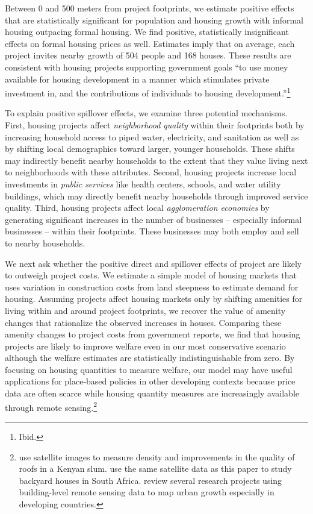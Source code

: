 \documentclass[12pt]{article}
\begin{document}
Between 0 and 500 meters from project footprints, we estimate positive effects that are statistically significant for population and housing growth with informal housing outpacing formal housing.   We find positive, statistically insignificant effects on formal housing prices as well.  Estimates imply that on average, each project invites nearby growth of 504 people and 168 houses.  These results are consistent with housing projects supporting government goals ``to use money available for housing development in a manner which stimulates private investment in, and the contributions of individuals to housing development.''\footnote{Ibid.} 

To explain positive spillover effects, we examine three potential mechanisms.  First, housing projects affect \textit{neighborhood quality} within their footprints both by increasing household access to piped water, electricity, and sanitation as well as by shifting local demographics toward larger, younger households.  These shifts may indirectly benefit nearby households to the extent that they value living next to neighborhoods with these attributes.  Second, housing projects increase local investments in \textit{public services} like health centers, schools, and water utility buildings, which may directly benefit nearby households through improved service quality.  Third, housing projects affect local \textit{agglomeration economies} by generating significant increases in the number of businesses -- especially informal businesses -- within their footprints.  These businesses may both employ and sell to nearby households.

We next ask whether the positive direct and spillover effects of project are likely to outweigh project costs.  We estimate a simple model of housing markets that uses variation in construction costs from land steepness to estimate demand for housing.  Assuming projects affect housing markets only by shifting amenities for living within and around project footprints, we recover the value of amenity changes that rationalize the observed increases in houses.  Comparing these amenity changes to project costs from government reports, we find that housing projects are likely to improve welfare even in our most conservative scenario although the welfare estimates are statistically indistinguishable from zero.  By focusing on housing quantities to measure welfare, our model may have useful applications for place-based policies in other developing contexts because price data are often scarce while housing quantity measures are increasingly available through remote sensing.\footnote{ \cite{marxthere} use satellite images to measure density and improvements in the quality of roofs in a Kenyan slum.  \cite{Brueckner2018backyarding} use the same satellite data as this paper to study backyard houses in South Africa. \cite{donaldson2016view} review several research projects using building-level remote sensing data to map urban growth especially in developing countries. }  
 
\end{document}
